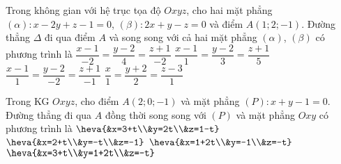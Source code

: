 \begin{ex}%
	Trong không gian với hệ trục tọa độ $Oxyz$, cho hai mặt phẳng $(\alpha) \colon x-2y+z-1=0$, $(\beta) \colon 2x+y-z=0$ và điểm $A(1;2;-1)$. Đường thẳng $\Delta $ đi qua điểm $A$ và song song với cả hai mặt phẳng $(\alpha)$, $(\beta)$ có phương trình là
	\choice
	{$\dfrac{x-1}{-2}=\dfrac{y-2}{4}=\dfrac{z+1}{-2}$}
	{\True $\dfrac{x-1}{1}=\dfrac{y-2}{3}=\dfrac{z+1}{5}$}
	{$\dfrac{x-1}{1}=\dfrac{y-2}{-2}=\dfrac{z+1}{-1}$}
	{$\dfrac{x}{1}=\dfrac{y+2}{2}=\dfrac{z-3}{1}$}
\end{ex}
\begin{ex}%
	Trong KG $Oxyz$, cho điểm $A(2;0;-1)$ và mặt phẳng $(P)\colon x+y-1=0$. Đường thẳng đi qua $A$ đồng thời song song với $(P)$ và mặt phẳng $Oxy$ có phương trình là
	\choice
	{$\heva{&x=3+t\\&y=2t\\&z=1-t}$}
	{\True $\heva{&x=2+t\\&y=-t\\&z=-1}$}
	{$\heva{&x=1+2t\\&y=-1\\&z=-t}$}
	{$\heva{&x=3+t\\&y=1+2t\\&z=-t}$}
\end{ex}
